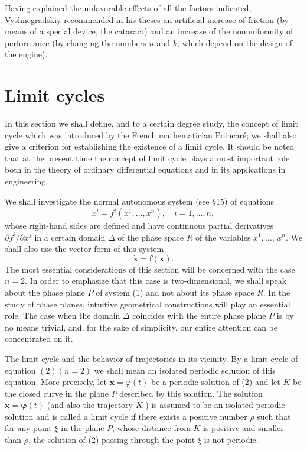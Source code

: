 \documentclass[10pt,a5paper]{book}
\theoremstyle{plain}
\theoremstyle{definition}
\theoremstyle{remark}
\begin{document}
Having explained the unfavorable effects of all the factors indicated, Vyshnegradskiy recommended in his theses an artificial increase of friction (by means of a special device, the cataract) and an increase of the nonuniformity of performance (by changing the numbers $n$ and $k$, which depend on the design of the engine).

\section{Limit cycles}
In this section we shall define, and to a certain degree study, the concept of limit cycle which was introduced by the French mathematician Poincaré; we shall also give a criterion for establishing the existence of a limit cycle. It should be noted that at the present time the concept of limit cycle plays a most important role both in the theory of ordinary differential equations and in its applications in engineering.

We shall investigate the normal autonomous system (see §15) of equations
\begin{equation*}
\dot{x}^{i}=f^{i}\left(x^{1}, \ldots, x^{n}\right), \quad i=1, \ldots, n, \tag{1}
\end{equation*}
whose right-hand sides are defined and have continuous partial derivatives $\partial f^{i} / \partial x^{j}$ in a certain domain $\Delta$ of the phase space $R$ of the variables $x^{1}, \ldots$, $x^{n}$. We shall also use the vector form of this system
\begin{equation*}
\dot{\mathbf{x}}=\mathbf{f}(\mathbf{x}) . \tag{2}
\end{equation*}
The most essential considerations of this section will be concerned with the case $n=2$. In order to emphasize that this case is two-dimensional,
we shall speak about the phase plane $P$ of system (1) and not about its phase space $R$. In the study of phase planes, intuitive geometrical constructions will play an essential role. The case when the domain $\Delta$ coincides with the entire phase plane $P$ is by no means trivial, and, for the sake of simplicity, our entire attention can be concentrated on it.

The limit cycle and the behavior of trajectories in its vicinity. By a limit cycle of equation $(2)(n=2)$ we shall mean an isolated periodic solution of this equation. More precisely, let $\mathbf{x}=\varphi(t)$ be a periodic solution of (2) and let $K$ be the closed curve in the plane $P$ described by this solution. The solution $\mathbf{x}=\boldsymbol{\varphi}(t)$ (and also the trajectory $K$ ) is assumed to be an isolated periodic solution and is called a limit cycle if there exists a positive number $\rho$ such that for any point $\xi$ in the plane $P$, whose distance from $K$ is positive and smaller than $\rho$, the solution of (2) passing through the point $\xi$ is not periodic.
\end{document}
